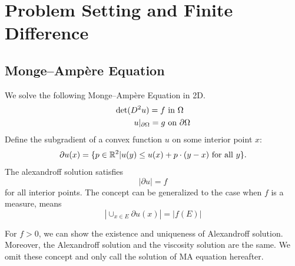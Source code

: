 \documentclass{article}
\begin{document}
	\maketitle
	\thispagestyle{fancy}
	\tableofcontents
	
	\section*{}

\section{Problem Setting and Finite Difference}
\subsection{Monge--Amp\`ere Equation}
We solve the following Monge--Amp\`ere Equation in 2D. 
\begin{align}
\det(D^2u) = f & \text{ in } \Omega\\ 
u|_{\partial \Omega} = g & \text{ on } \partial \Omega
\end{align}
Define the subgradient of a convex function $u$ on some interior point $x$:
$$\partial u(x) = \{p \in \mathbb R^2|u(y) \le u(x) + p\cdot (y-x) \text{ for all } y\}.$$
The alexandroff solution satisfies 
$$|\partial u| = f$$
for all interior points. The concept can be generalized to the case when $f$ is a measure, means 
$$|\cup_{x\in E}\partial u(x)| = |f(E)|$$

For $f>0$, we can show the existence and uniqueness of Alexandroff solution. Moreover, the Alexandroff solution and the viscosity solution are the same. We omit these concept and only call the solution of MA equation hereafter.
\end{document}
